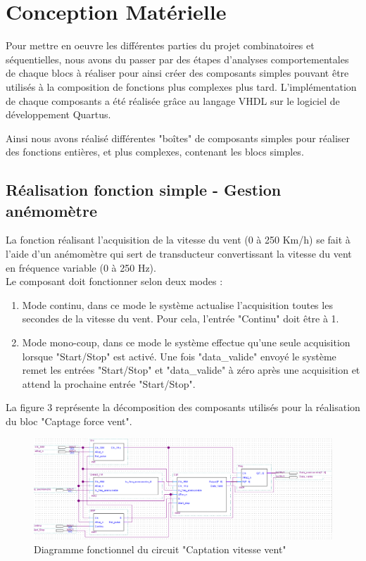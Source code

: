 \section{Conception Matérielle}
Pour mettre en oeuvre les différentes parties du projet combinatoires et séquentielles, nous avons du passer par des étapes d'analyses comportementales de chaque blocs à réaliser pour ainsi créer des composants simples pouvant être utilisés à la composition de fonctions plus complexes plus tard. L'implémentation de chaque composants a été réalisée grâce au langage VHDL sur le logiciel de développement Quartus.

Ainsi nous avons réalisé différentes "boîtes" de composants simples pour réaliser des fonctions entières, et plus complexes, contenant les blocs simples.

\subsection{Réalisation fonction simple - Gestion anémomètre}
La fonction réalisant l'acquisition de la vitesse du vent (0 à 250 Km/h) se fait à l'aide d'un anémomètre qui sert de transducteur convertissant la vitesse du vent en fréquence variable (0 à 250 Hz). 
\vspace{0.5cm}\\
Le composant doit fonctionner selon deux modes :
\begin{enumerate}
    \item Mode continu, dans ce mode le système actualise l'acquisition toutes les secondes de la vitesse du vent. Pour cela, l'entrée "Continu" doit être à 1. 
    \item Mode mono-coup, dans ce mode le système effectue qu'une seule acquisition lorsque "Start/Stop" est activé. Une fois "data\_valide" envoyé le système remet les entrées "Start/Stop" et "data\_valide" à zéro après une acquisition et attend la prochaine entrée "Start/Stop".
\end{enumerate}
\vspace{0.5cm}
La figure 3 représente la décomposition des composants utilisés pour la réalisation du bloc "Captage force vent". 

\begin{figure}[h]
    \begin{center}
      \includegraphics[width=\textwidth]{images/captation.png}
      \caption{Diagramme fonctionnel du circuit "Captation vitesse vent"}
    \end{center}
  \end{figure}

